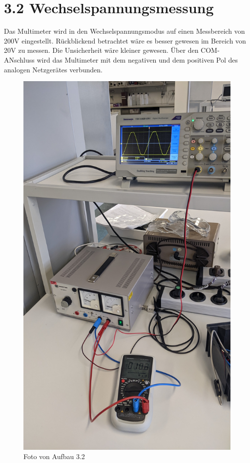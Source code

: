 \documentclass[
  9pt,
]{article}
\begin{document}
\hypertarget{wechselspannungsmessung}{%
\section{3.2 Wechselspannungsmessung}\label{wechselspannungsmessung}}

Das Multimeter wird in den Wechselspannungsmodus auf einen Messbereich
von 200V eingestellt. Rückblickend betrachtet wäre es besser gewesen im
Bereich von 20V zu messen. Die Unsicherheit wäre kleiner gewesen. Über
den COM-ANschluss wird das Multimeter mit dem negativen und dem
positiven Pol des analogen Netzgerätes verbunden.

\begin{figure}
\centering
\includegraphics[width=\textwidth,height=0.2\textheight]{Bilder/3.2.jpg}
\caption{Foto von Aufbau 3.2}
\end{figure}
\end{document}
